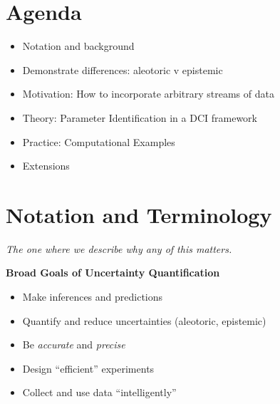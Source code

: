 \section{Agenda}

\begin{frame}

\begin{itemize}

\item Notation and background

\bigskip
\item Demonstrate differences: aleotoric v epistemic

\bigskip
\item Motivation: How to incorporate arbitrary streams of data

\bigskip
\item Theory: Parameter Identification in a DCI framework

\bigskip
\item Practice: Computational Examples

\bigskip
\item Extensions

\end{itemize}

\end{frame}


\section{Notation and Terminology}
\begin{frame}[t]{\it The one where we describe why any of this matters.}

{\bf Broad Goals of Uncertainty Quantification}

\medskip
    \begin{itemize}
	    \item Make inferences and predictions

			\bigskip
        \item Quantify and reduce uncertainties (aleotoric, epistemic)

			\bigskip
	    \item Be \emph{accurate} and \emph{precise}

			\bigskip
	    \item Design ``efficient'' experiments

			\bigskip
	    \item Collect and use data ``intelligently''
    \end{itemize}

\end{frame}

